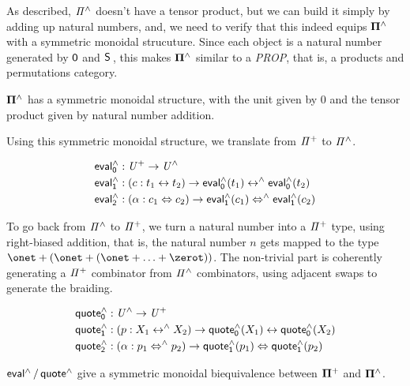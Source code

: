 As described, $\mathit{{\Pi}^{\wedge}}$ doesn't have a tensor product, but we can build it simply by adding up natural numbers, and,
we need to verify that this indeed equips $\mathbf{\Pi^{\wedge}}$ with a symmetric monoidal strucuture. Since each object is a
natural number generated by $\operatorname{\mathsf{0}}$ and $\suc$, this makes $\mathbf{\Pi^{\wedge}}$ similar to a \emph{PROP}, that is, a products and
permutations category.

\begin{proposition}
  $\mathbf{\Pi^{\wedge}}$ has a symmetric monoidal structure, with the unit given by 0 and the tensor product given by natural
  number addition.
\end{proposition}

Using this symmetric monoidal structure, we translate from $\mathit{{\Pi}^{+}}$ to $\mathit{{\Pi}^{\wedge}}$.

\begin{definition}
  \begin{align*}
    \evalh_{0} & : \UPlus \to \UHat                                                          \\
    \evalh_{1} & : (c : t_{1} \iso t_{2}) \to \evalh_{0}(t_{1}) \isoh \evalh_{0}(t_{2})      \\
    \evalh_{2} & : (\alpha : c_{1} \Iso c_{2}) \to \evalh_{1}(c_{1}) \Isoh \evalh_{1}(c_{2})
  \end{align*}
\end{definition}

To go back from $\mathit{{\Pi}^{\wedge}}$ to $\mathit{{\Pi}^{+}}$, we turn a natural number into a $\mathit{{\Pi}^{+}}$ type, using right-biased
addition, that is, the natural number $n$ gets mapped to the type $\onet + (\onet + (\onet + \ldots + \zerot))$. The
non-trivial part is coherently generating a $\mathit{{\Pi}^{+}}$ combinator from $\mathit{{\Pi}^{\wedge}}$ combinators, using adjacent swaps
to generate the braiding.

\begin{definition}
  \begin{align*}
    \quoteh_{0} & : \UHat \to \UPlus                                                            \\
    \quoteh_{1} & : (p : X_{1} \isoh X_{2}) \to \quoteh_{0}(X_{1}) \iso \quoteh_{0}(X_{2})      \\
    \quoteh_{2} & : (\alpha : p_{1} \Isoh p_{2}) \to \quoteh_{1}(p_{1}) \Iso \quoteh_{1}(p_{2})
  \end{align*}
\end{definition}

\begin{proposition}
  $\evalh/\quoteh$ give a symmetric monoidal biequivalence between $\mathbf{\Pi^{+}}$ and $\mathbf{\Pi^{\wedge}}$.
\end{proposition}

